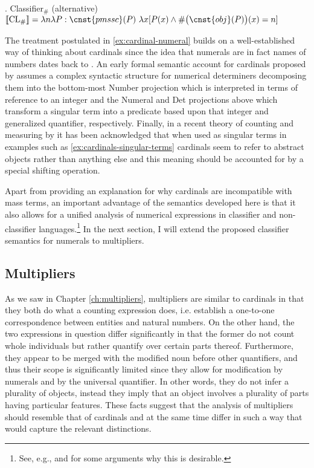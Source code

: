 	\ex. Classifier$_\#$ (alternative)\\
	$\llbracket \text{CL}_\#\rrbracket = \lambda n \lambda P : \cnst{pmssc}(P)\ \lambda x [P(x) \wedge \#\big(\cnst{obj}(P)\big)(x) = n]$\label{ex:classifier-hash-alt}
	
	The treatment postulated in \ref{ex:cardinal-numeral} builds on a well-established way of thinking about cardinals since the idea that numerals are in fact names of numbers dates back to \citet{frege1884grundlagen}. An early formal semantic account for cardinals proposed by \citet{scha1981distributive} assumes a complex syntactic structure for numerical determiners decomposing them into the bottom-most Number projection which is interpreted in terms of reference to an integer and the Numeral and Det projections above which transform a singular term into a predicate based upon that integer and generalized quantifier, respectively. Finally, in a recent theory of counting and measuring by \citet{rothstein2012numericals,rothstein2013fregean,rothstein2017semantics} it has been acknowledged that when used as singular terms in examples such as \ref{ex:cardinals-singular-terms} cardinals seem to refer to abstract objects rather than anything else and this meaning should be accounted for by a special shifting operation.
	
	Apart from providing an explanation for why cardinals are incompatible with mass terms, an important advantage of the semantics developed here is that it also allows for a unified analysis of numerical expressions in classifier and non-classifier languages.\footnote{See, e.g., \citet{kobuchi-philip2006identity} and \citet{wagiel_caha2020universal} for some arguments why this is desirable.}  In the next section, I will extend the proposed classifier semantics for numerals to multipliers.
	
	\subsection{Multipliers}\label{sec:multipliers}\largerpage[1.5]

	As we saw in Chapter \ref{ch:multipliers}, multipliers are similar to cardinals in that they both do what a counting expression does, i.e. establish a one-to-one correspondence between entities and natural numbers. On the other hand, the two expressions in question differ significantly in that the former do not count whole individuals but rather quantify over certain parts thereof. Furthermore, they appear to be merged with the modified noun before other quantifiers, and thus their scope is significantly limited since they allow for modification by numerals and by the universal quantifier. In other words, they do not infer a plurality of objects, instead they imply that an object involves a plurality of parts having particular features. These facts suggest that the analysis of multipliers should resemble that of cardinals and at the same time differ in such a way that would capture the relevant distinctions.
	
